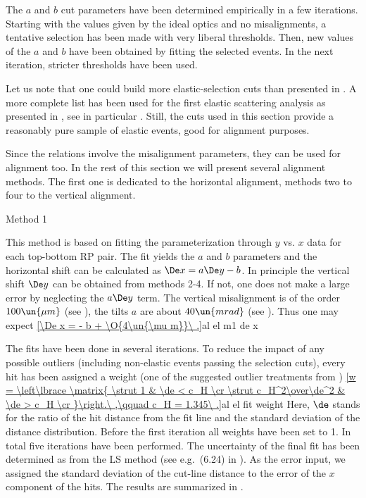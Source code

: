 The $a$ and $b$ cut parameters have been determined empirically in a few iterations. Starting with the values given by the ideal optics and no misalignments, a tentative selection has been made with very liberal thresholds. Then, new values of the $a$ and $b$ have been obtained by fitting the selected events. In the next iteration, stricter thresholds have been used.

Let us note that one could build more elastic-selection cuts than presented in . A more complete list has been used for the first elastic scattering analysis as presented in , see in particular . Still, the cuts used in this section provide a reasonably pure sample of elastic events, good for alignment purposes.



Since the relations  involve the misalignment parameters, they can be used for alignment too. In the rest of this section we will present several alignment methods. The first one is dedicated to the horizontal alignment, methods two to four to the vertical alignment.

\caption{Method 1}

This method is based on fitting the parameterization  through $y$ vs. $x$ data for each top-bottom RP pair. The fit yields the $a$ and $b$ parameters and the horizontal shift can be calculated as $\De x = a \De y - b$. In principle the vertical shift $\De y$ can be obtained from methods 2-4. If not, one does not make a large error by neglecting the $a\De y$ term. The vertical misalignment is of the order $100\un{\mu m}$ (see ), the tilts $a$ are about $40\un{mrad}$ (see ). Thus one may expect
\eqref{\De x = - b + \O{4\un{\mu m}}\ .}{al el m1 de x}

The fits have been done in several iterations. To reduce the impact of any possible outliers (including non-elastic events passing the selection cuts), every hit has been assigned a weight (one of the suggested outlier treatments from )
\eqref{w = \left\lbrace \matrix{
\strut 1				& \de < c_H \cr
\strut c_H^2\over\de^2	& \de > c_H \cr
}\right.\ ,\qquad c_H = 1.345\ .}{al el fit weight}
Here, $\de$ stands for the ratio of the hit distance from the fit line and the standard deviation of the distance distribution. Before the first iteration all weights have been set to 1. In total five iterations have been performed. The uncertainty of the final fit has been determined as from the LS method (see e.g.~(6.24) in ). As the error input, we assigned the standard deviation of the cut-line distance to the error of the $x$ component of the hits. The results are summarized in .

